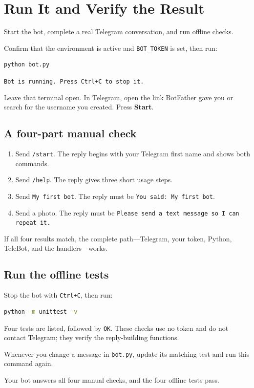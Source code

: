 \chapter{Run It and Verify the Result}

\begin{goalbox}
Start the bot, complete a real Telegram conversation, and run offline checks.
\end{goalbox}

Confirm that the environment is active and \texttt{BOT\_TOKEN} is set, then run:

\begin{lstlisting}[language=bash,numbers=none]
python bot.py
\end{lstlisting}

\begin{resultbox}
\texttt{Bot is running. Press Ctrl+C to stop it.}
\end{resultbox}

Leave that terminal open. In Telegram, open the link BotFather gave you or search
for the username you created. Press \textbf{Start}.

\section{A four-part manual check}

\begin{enumerate}
\item Send \texttt{/start}. The reply begins with your Telegram first name and
shows both commands.
\item Send \texttt{/help}. The reply gives three short usage steps.
\item Send \texttt{My first bot}. The reply must be
\texttt{You said: My first bot}.
\item Send a photo. The reply must be
\texttt{Please send a text message so I can repeat it.}
\end{enumerate}

If all four results match, the complete path---Telegram, your token, Python,
TeleBot, and the handlers---works.

\section{Run the offline tests}

Stop the bot with \texttt{Ctrl+C}, then run:

\begin{lstlisting}[language=bash,numbers=none]
python -m unittest -v
\end{lstlisting}

\begin{resultbox}
Four tests are listed, followed by \texttt{OK}. These checks use no token and do
not contact Telegram; they verify the reply-building functions.
\end{resultbox}

Whenever you change a message in \texttt{bot.py}, update its matching test and
run this command again.

\begin{checkpointbox}
Your bot answers all four manual checks, and the four offline tests pass.
\end{checkpointbox}
